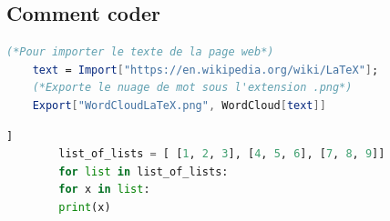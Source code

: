 \documentclass[french, babel]{article}
\begin{document}
\subsection[Sous-section]{Comment coder}
	\lipsum[15-16]
	\begin{lstlisting}[language=Mathematica, caption=Example Mathematica]
	(*Pour importer le texte de la page web*)
	text = Import["https://en.wikipedia.org/wiki/LaTeX"];
	(*Exporte le nuage de mot sous l'extension .png*)
	Export["WordCloudLaTeX.png", WordCloud[text]]
	\end{lstlisting}
	\begin{multicols}{3}
		\lipsum[16-17]
	\end{multicols}
	\begin{lstlisting}[language=Python,caption=Example Python \url{https://www.overleaf.com/learn/latex/code_listing}]]
		list_of_lists = [ [1, 2, 3], [4, 5, 6], [7, 8, 9]]
		for list in list_of_lists:
		for x in list:
		print(x)
	\end{lstlisting}
	\begin{multicols}{3}
		\lipsum[17-18]
	\end{multicols}
	
\end{document}
